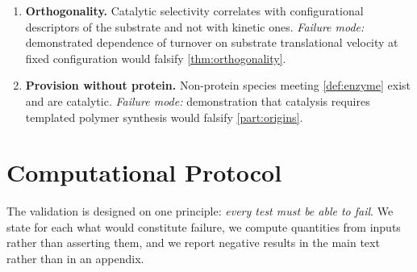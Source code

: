\documentclass[11pt,twocolumn,a4paper]{article}
\theoremstyle{plain}
\theoremstyle{definition}
\theoremstyle{remark}
\begin{document}
\begin{enumerate}[label=\textbf{P\arabic*.},leftmargin=3em,itemsep=0.6em]
\item \textbf{Orthogonality.} Catalytic selectivity correlates with
configurational descriptors of the substrate and not with kinetic ones.
\emph{Failure mode:} demonstrated dependence of turnover on substrate
translational velocity at fixed configuration would falsify
\cref{thm:orthogonality}.

\item \textbf{Provision without protein.} Non-protein species meeting
\cref{def:enzyme} exist and are catalytic. \emph{Failure mode:} demonstration
that catalysis requires templated polymer synthesis would falsify
\cref{part:origins}.
\end{enumerate}

\section{Computational Protocol}
\label{sec:protocol}

The validation is designed on one principle: \emph{every test must be able to
fail}. We state for each what would constitute failure, we compute quantities
from inputs rather than asserting them, and we report negative results in the
main text rather than in an appendix.
\end{document}
